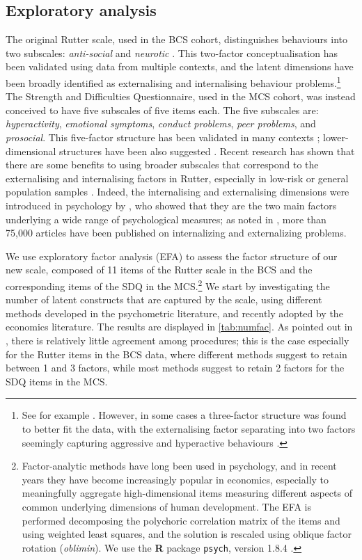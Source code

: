 \subsection{Exploratory analysis \label{sec:ea}}

The original Rutter scale, used in the BCS cohort, distinguishes behaviours into two subscales: \emph{anti-social} and \emph{neurotic} \citep{Rutter1970}. This two-factor conceptualisation has been validated using data from multiple contexts, and the latent dimensions have been broadly identified as externalising and internalising behaviour problems.\footnote{See for example \citet{Fowler1979,Venables1983,Tremblay1987,Berglund1999,Klein2009}. However, in some cases a three-factor structure was found to better fit the data, with the externalising factor separating into two factors seemingly capturing aggressive and hyperactive behaviours \citep{Behar1974,McGee1985}.} The Strength and Difficulties Questionnaire, used in the MCS cohort, was instead conceived to have five subscales of five items each. The five subscales are: \emph{hyperactivity}, \emph{emotional symptoms}, \emph{conduct problems}, \emph{peer problems}, and \emph{prosocial}. This five-factor structure has been validated in many contexts \citep{Stone2010}; lower-dimensional structures have been also suggested \citep{Dickey2004}. Recent research has shown that there are some benefits to using broader subscales that correspond to the externalising and internalising factors in Rutter, especially in low-risk or general population samples \citep{Goodman2010}. Indeed, the internalising and externalising dimensions were introduced in psychology by \citet{Achenbach1966}, who showed that they are the two main factors underlying a wide range of psychological measures; as noted in \citet{Achenbach2016}, more than 75,000 articles have been published on internalizing and externalizing problems.

We use exploratory factor analysis (EFA) to assess the factor structure of our new scale, composed of 11 items of the Rutter scale in the BCS and the corresponding items of the SDQ in the MCS.\footnote{Factor-analytic methods have long been used in psychology, and in recent years they have become increasingly popular in economics, especially to meaningfully aggregate high-dimensional items measuring different aspects of common underlying dimensions of human development. The EFA is performed decomposing the polychoric correlation matrix of the items and using weighted least squares, and the solution is rescaled using oblique factor rotation (\emph{oblimin}). We use the \textbf{\textsf{R}} package \texttt{psych}, version 1.8.4 \citep{Revelle2018}.} We start by investigating the number of latent constructs that are captured by the scale, using different methods developed in the psychometric literature, and recently adopted by the economics literature. The results are displayed in \autoref{tab:numfac}. As pointed out in \citet{Conti2014}, there is relatively little agreement among procedures; this is the case especially for the Rutter items in the BCS data, where different methods suggest to retain between 1 and 3 factors, while most methods suggest to retain 2 factors for the SDQ items in the MCS. 

